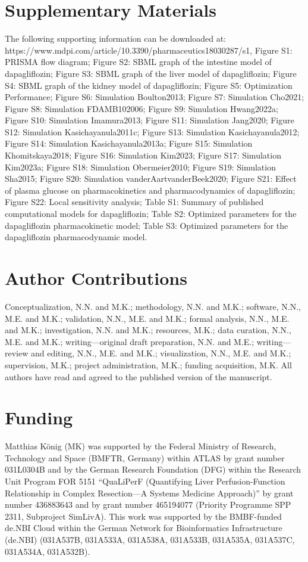 {\color{red}
\section{Supplementary Materials}\label{sec:reproducibility}\justifying{}
The following supporting information can be downloaded at: https://www.mdpi.com/article/10.3390/pharmaceutics18030287/s1, Figure S1: PRISMA flow diagram; Figure S2: SBML graph of the intestine model of dapagliflozin; Figure S3: SBML graph of the liver model of dapagliflozin; Figure S4: SBML graph of the kidney model of dapagliflozin; Figure S5: Optimization Performance; Figure S6: Simulation Boulton2013; Figure S7: Simulation Cho2021; Figure S8: Simulation FDAMB102006; Figure S9: Simulation Hwang2022a; Figure S10: Simulation Imamura2013; Figure S11: Simulation Jang2020; Figure S12: Simulation Kasichayanula2011c; Figure S13: Simulation Kasichayanula2012; Figure S14: Simulation Kasichayanula2013a; Figure S15: Simulation Khomitskaya2018; Figure S16: Simulation Kim2023; Figure S17: Simulation Kim2023a; Figure S18: Simulation Obermeier2010; Figure S19: Simulation Sha2015; Figure S20: Simulation vanderAartvanderBeek2020; Figure S21: Effect of plasma glucose on pharmacokinetics and pharmacodynamics of dapagliflozin; Figure S22: Local sensitivity analysis; Table S1: Summary of published computational models for dapagliflozin; Table S2: Optimized parameters for the dapagliflozin pharmacokinetic model; Table S3: Optimized parameters for the dapagliflozin pharmacodynamic model.
\section{Author Contributions}
Conceptualization, N.N. and M.K.; methodology, N.N. and M.K.; software, N.N., M.E. and M.K.; validation, N.N., M.E. and M.K.; formal analysis, N.N., M.E. and M.K.; investigation, N.N. and M.K.; resources, M.K.; data curation, N.N., M.E. and M.K.; writing—original draft preparation, N.N. and M.E.; writing—review and editing, N.N., M.E. and M.K.; visualization, N.N., M.E. and M.K.; supervision, M.K.; project administration, M.K.; funding acquisition, M.K. All authors have read and agreed to the published version of the manuscript.
\section{Funding}
Matthias König (MK) was supported by the Federal Ministry of Research, Technology and Space (BMFTR, Germany) within ATLAS by grant number 031L0304B and by the German Research Foundation (DFG) within the Research Unit Program FOR 5151 “QuaLiPerF (Quantifying Liver Perfusion-Function Relationship in Complex Resection—A Systems Medicine Approach)” by grant number 436883643 and by grant number 465194077 (Priority Programme SPP 2311, Subproject SimLivA). This work was supported by the BMBF-funded de.NBI Cloud within the German Network for Bioinformatics Infrastructure (de.NBI) (031A537B, 031A533A, 031A538A, 031A533B, 031A535A, 031A537C, 031A534A, 031A532B).
}
